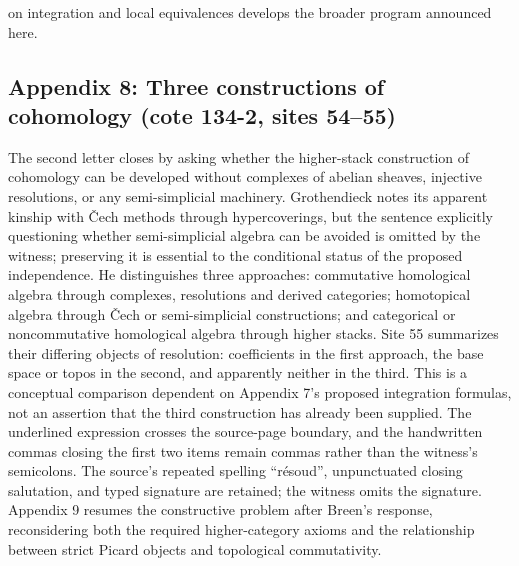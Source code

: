 \documentclass[10pt,oneside]{book}
\begin{document}
on integration and local equivalences develops the broader program announced here.

\subsection*{Appendix 8: Three constructions of cohomology (cote 134-2, sites 54--55)}
The second letter closes by asking whether the higher-stack construction of cohomology can be developed without complexes of abelian sheaves, injective resolutions, or any semi-simplicial machinery. Grothendieck notes its apparent kinship with \v Cech methods through hypercoverings, but the sentence explicitly questioning whether semi-simplicial algebra can be avoided is omitted by the witness; preserving it is essential to the conditional status of the proposed independence. He distinguishes three approaches: commutative homological algebra through complexes, resolutions and derived categories; homotopical algebra through \v Cech or semi-simplicial constructions; and categorical or noncommutative homological algebra through higher stacks. Site 55 summarizes their differing objects of resolution: coefficients in the first approach, the base space or topos in the second, and apparently neither in the third. This is a conceptual comparison dependent on Appendix 7's proposed integration formulas, not an assertion that the third construction has already been supplied. The underlined expression crosses the source-page boundary, and the handwritten commas closing the first two items remain commas rather than the witness's semicolons. The source's repeated spelling ``résoud'', unpunctuated closing salutation, and typed signature are retained; the witness omits the signature. Appendix 9 resumes the constructive problem after Breen's response, reconsidering both the required higher-category axioms and the relationship between strict Picard objects and topological commutativity.
\end{document}
